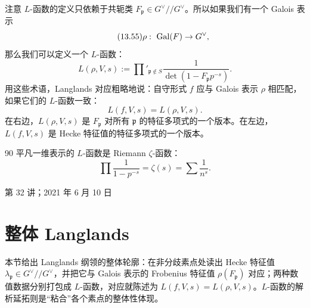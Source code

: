 注意 $L$-函数的定义只依赖于共轭类 $F_{\mathfrak p}\in G^\vee/\!/G^\vee$。所以如果我们有一个 Galois 表示
\begin{equation}\tag{13.55}
\rho:\ \mathrm{Gal}(F)\to G^\vee,
\end{equation}
那么我们可以定义一个 $L$-函数：
\begin{equation}\tag{13.56}
L(\rho,V,s):=\prod'_{\mathfrak p\notin S}\frac{1}{\det(1-F_{\mathfrak p}p^{-s})}.
\end{equation}
用这些术语，Langlands 对应粗略地说：自守形式 $f$ 应与 Galois 表示 $\rho$ 相匹配，如果它们的 $L$-函数一致：
\begin{equation}\tag{13.57}
L(f,V,s)=L(\rho,V,s).
\end{equation}
在右边，$L(\rho,V,s)$ 是 $F_{\mathfrak p}$ 对所有 $\mathfrak p$ 的特征多项式的一个版本。在左边，$L(f,V,s)$ 是 Hecke 特征值的特征多项式的一个版本。

\begin{srcex}{90}
平凡一维表示的 $L$-函数是 Riemann $\zeta$-函数：
\begin{equation}\tag{13.58}
\prod\frac{1}{1-p^{-s}}=\zeta(s)=\sum\frac{1}{n^s}.
\end{equation}
\end{srcex}

\begin{flushright}\small 第 32 讲；2021 年 6 月 10 日\end{flushright}

\section{整体 Langlands}\label{sec:13-5}

\begin{sectionkey}
本节给出 Langlands 纲领的整体轮廓：在非分歧素点处读出 Hecke 特征值 $\lambda_{\mathfrak p}\in G^\vee/\!/G^\vee$，并把它与 Galois 表示的 Frobenius 特征值 $\rho(F_{\mathfrak p})$ 对应；两种数值数据分别打包成 $L$-函数，对应就陈述为 $L(f,V,s)=L(\rho,V,s)$。$L$-函数的解析延拓则是“粘合”各个素点的整体性体现。
\end{sectionkey}

